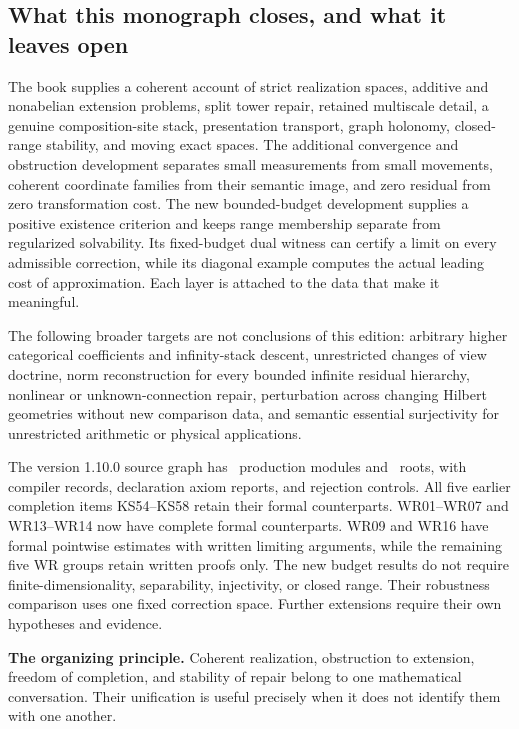 \subsection{What this monograph closes, and what it leaves open}
The book supplies a coherent account of strict realization spaces, additive and nonabelian extension problems, split tower repair, retained multiscale detail, a genuine composition-site stack, presentation transport, graph holonomy, closed-range stability, and moving exact spaces. The additional convergence and obstruction development separates small measurements from small movements, coherent coordinate families from their semantic image, and zero residual from zero transformation cost. The new bounded-budget development supplies a positive existence criterion and keeps range membership separate from regularized solvability. Its fixed-budget dual witness can certify a limit on every admissible correction, while its diagonal example computes the actual leading cost of approximation. Each layer is attached to the data that make it meaningful.

The following broader targets are not conclusions of this edition: arbitrary higher categorical coefficients and infinity-stack descent, unrestricted changes of view doctrine, norm reconstruction for every bounded infinite residual hierarchy, nonlinear or unknown-connection repair, perturbation across changing Hilbert geometries without new comparison data, and semantic essential surjectivity for unrestricted arithmetic or physical applications.

The version 1.10.0 source graph has \EditionBudgetModules\ production modules and \EditionBudgetRoots\ roots, with compiler records, declaration axiom reports, and rejection controls. All five earlier completion items KS54--KS58 retain their formal counterparts. WR01--WR07 and WR13--WR14 now have complete formal counterparts. WR09 and WR16 have formal pointwise estimates with written limiting arguments, while the remaining five WR groups retain written proofs only. The new budget results do not require finite-dimensionality, separability, injectivity, or closed range. Their robustness comparison uses one fixed correction space. Further extensions require their own hypotheses and evidence.

\begin{insight}
\textbf{The organizing principle.} Coherent realization, obstruction to extension, freedom of completion, and stability of repair belong to one mathematical conversation. Their unification is useful precisely when it does not identify them with one another.
\end{insight}
